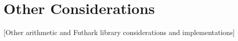 \section{Other Considerations}
[Other arithmetic and Futhark library considerations and implementations]
